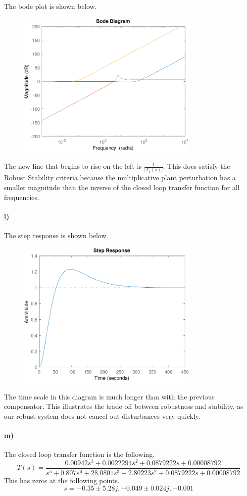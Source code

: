 \documentclass[12pt]{article}
\begin{document}
The bode plot is shown below.
\begin{figure}[H]
    \begin{center}
        \includegraphics[width=3.5in]{problem5k.pdf}
    \end{center}
\end{figure}
The new line that begins to rise on the left is \(\frac{1}{|T_1(s)|}\). This does
satisfy the Robust Stability criteria because the multiplicative plant perturbation
has a smaller magnitude than the inverse of the closed loop transfer function for all
frequencies.

\paragraph{l)}

The step response is shown below.
\begin{figure}[H]
    \begin{center}
        \includegraphics[width=3.5in]{problem5l.pdf}
    \end{center}
\end{figure}
The time scale in this diagram is much longer than with the previous compensator. This
illustrates the trade off between robustness and stability, as our robust system does
not cancel out disturbances very quickly.

\paragraph{m)}

The closed loop transfer function is the following.
\[T(s)=\frac{0.00942s^3+0.0022294s^2+0.0879222s+0.00008792}{s^5+0.807s^4+28.0801s^3+2.80223s^2+0.0879222s+0.00008792}\]
This has zeros at the following points.
\[s=-0.35 \pm 5.28j,-0.049 \pm 0.024j,-0.001\]
\end{document}
